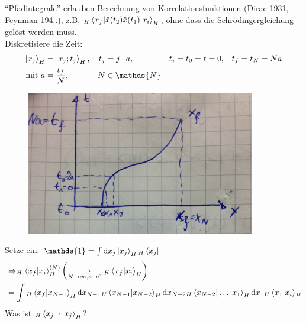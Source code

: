 ``Pfadintegrale'' erlauben Berechnung von Korrelationsfunktionen (Dirac 1931, Feynman 194..), z.B. $_H\braket{x_f | \hat{x} (t_2) \hat{x} (t_1) | x_i}_H$, ohne dass die Schrödingergleichung gelöst werden muss. 
\\
Diskretisiere die Zeit:
	\begin{align*}
		\ket{x_j}_H &= \ket{x_j ; t_j}_H ,&
		t_j &= j \cdot a ,& t_i &= t_0 = t = 0,&
		t_f &= t_N = Na \\
		\text{mit } a &= \frac{t_f}{N} ,& N &\in \mathds{N}
	\end{align*}
	\begin{figure} [h]
		\begin{center}
			\includegraphics[width=10cm]{Uebergangsamplituden1}
		\end{center}
	\end{figure}
Setze ein: $\mathds{1} = \int \diff x_j \ket{x_j}_H \vphantom{\bra{x_j}}_H\bra{x_j}$
	\begin{align*}
		&\Rightarrow _H\braket{x_f | x_i}_H^{(N)} 
		\left(\underset{N\rightarrow \infty , a \rightarrow 0}{\longrightarrow} \vphantom{\braket{x_f | x_i}}_H\braket{x_f | x_i}_H\right) \\
		&= \int \vphantom{\braket{x_f | x_i}}_H\braket{x_f | x_{N - 1}}_H \diff x_{N-1} \vphantom{\braket{x_f | x_i}}_H\braket{x_{N-1} | x_{N-2}}_H 
		\diff x_{N-2} \vphantom{\braket{x_f | x_i}}_H\braket{x_{N-2} | \ldots | x_1}_H
		\diff x_1 \vphantom{\braket{x_f | x_i}}_H\braket{x_1 | x_i}_H
	\end{align*} 
Was ist $_H\braket{x_{j+1} | x_j}_H$?

